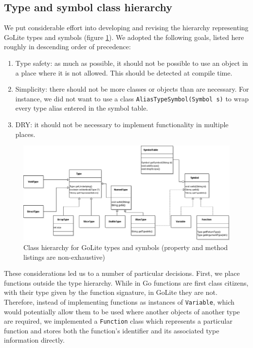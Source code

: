 \documentclass[oneside]{article}
\begin{document}
\subsection{Type and symbol class hierarchy}

We put considerable effort into developing and revising the hierarchy representing GoLite types and symbols (figure \ref{fig:symbol_table_uml}). We adopted the following goals, listed here roughly in descending order of precedence:

\begin{enumerate}
    \item Type safety: as much as possible, it should not be possible to use an object in a place where it is not allowed. This should be detected at compile time.
    \item Simplicity: there should not be more classes or objects than are necessary. For instance, we did not want to use a class \texttt{AliasTypeSymbol(Symbol s)} to wrap every type alias entered in the symbol table.
    \item DRY: it should not be necessary to implement functionality in multiple places.
\end{enumerate}

\begin{figure}
    \includegraphics[width=\textwidth]{symbol_table_uml}
    \caption{Class hierarchy for GoLite types and symbols (property and method listings are non-exhaustive)}
    \label{fig:symbol_table_uml}
\end{figure}

These considerations led us to a number of particular decisions. First, we place functions outside the type hierarchy. While in Go functions are first class citizens, with their type given by the function signature, in GoLite they are not. Therefore, instead of implementing functions as instances of \texttt{Variable}, which would potentially allow them to be used where another objects of another type are required, we implemented a \texttt{Function} class which represents a particular function and stores both the function's identifier and its associated type information directly.
\end{document}
